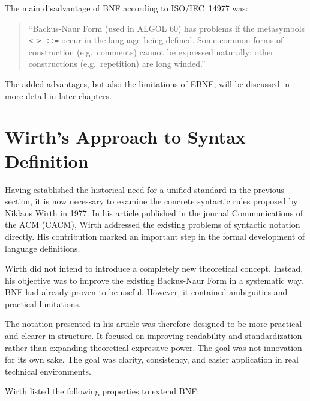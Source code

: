 The main disadvantage of BNF according to ISO/IEC~14977 was:

\begin{quote}
``Backus-Naur Form (used in ALGOL 60) has problems if the metasymbols \texttt{< > ::=} occur in the language being defined. Some common forms of construction (e.g.\ comments) cannot be expressed naturally; other constructions (e.g.\ repetition) are long winded.'' \cite[p.~VII]{ISO/IEC149771996InformationBNF}
\end{quote}


The added advantages, but also the limitations of EBNF, will be discussed in more detail in later chapters.

\section{Wirth's Approach to Syntax Definition}

Having established the historical need for a unified standard in the previous section, it is now necessary to examine the concrete syntactic rules proposed by Niklaus Wirth in 1977. In his article published in the journal Communications of the ACM (CACM), Wirth addressed the existing problems of syntactic notation directly. His contribution marked an important step in the formal development of language definitions.

Wirth did not intend to introduce a completely new theoretical concept. Instead, his objective was to improve the existing Backus-Naur Form in a systematic way. BNF had already proven to be useful. However, it contained ambiguities and practical limitations.

The notation presented in his article was therefore designed to be more practical and clearer in structure. It focused on improving readability and standardization rather than expanding theoretical expressive power. The goal was not innovation for its own sake. The goal was clarity, consistency, and easier application in real technical environments.

Wirth listed the following properties to extend BNF:

